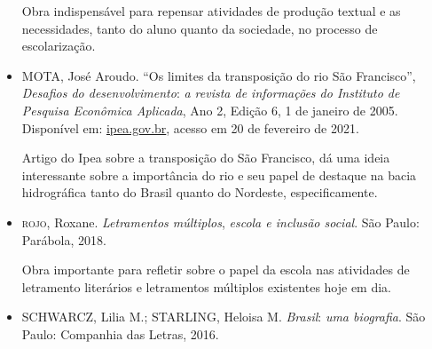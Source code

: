 \documentclass[12pt]{extarticle}
\begin{document}
\begin{itemize}
    Obra indispensável para repensar atividades de produção textual e as
    necessidades, tanto do aluno quanto da sociedade, no processo de
    escolarização.

\item 	\textsc{MOTA}, José Aroudo. ``Os limites da transposição do rio São
    Francisco'', \emph{Desafios do desenvolvimento}: \emph{a revista de
    informações do Instituto de Pesquisa Econômica Aplicada}, Ano 2,
    Edição 6, 1 de janeiro de 2005. Disponível em:
    \href{https://www.ipea.gov.br/desafios/index.php?option=com_content\&view=article\&id=723:os-limites-da-transposicao-do-rio-sao-francisco\&catid=29:artigos-materias\&Itemid=34}{ipea.gov.br},
    acesso em 20 de fevereiro de 2021.

    Artigo do Ipea sobre a transposição do São Francisco, dá uma ideia
    interessante sobre a importância do rio e seu papel de destaque na
    bacia hidrográfica tanto do Brasil quanto do Nordeste,
    especificamente.

 \item   \textsc{rojo}, Roxane. \emph{Letramentos múltiplos}, \emph{escola e inclusão
    social}. São Paulo: Parábola, 2018.

    Obra importante para refletir sobre o papel da escola nas atividades
    de letramento literários e letramentos múltiplos existentes hoje em
    dia.

 \item   \textsc{SCHWARCZ,} Lilia M.; \textsc{STARLING}, Heloisa M.
    \emph{Brasil}: \emph{uma biografia}. São Paulo: Companhia das
    Letras, 2016.
\end{itemize}
\end{document}
